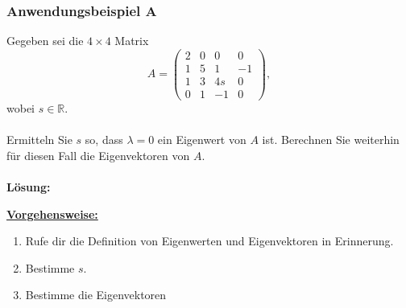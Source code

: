 \subsubsection*{Anwendungsbeispiel A}
Gegeben sei die $4 \times 4$ Matrix
\begin{equation*}
A= 
\begin{pmatrix}
2 & 0 &0 & 0 \\
1 & 5 & 1  & -1\\
1 & 3 & 4s & 0 \\
0 & 1 & -1 & 0
\end{pmatrix},
\end{equation*}
wobei $s \in \mathbb{R}$.\\ \\
Ermitteln Sie $s$ so, dass $\lambda = 0$ ein Eigenwert von $A$ ist.
Berechnen Sie weiterhin für diesen Fall die Eigenvektoren von $A$.
\\
\\
\textbf{Lösung:}
\begin{mdframed}
\underline{\textbf{Vorgehensweise:}}
\renewcommand{\labelenumi}{\theenumi.}
\begin{enumerate}
\item Rufe dir die Definition von Eigenwerten und Eigenvektoren in Erinnerung.
\item Bestimme $s$.
\item Bestimme die Eigenvektoren
\end{enumerate}
\end{mdframed}

